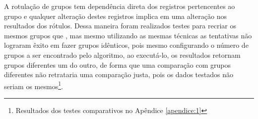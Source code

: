 A rotulação de grupos tem dependência direta dos registros pertencentes ao grupo e qualquer alteração destes registros implica em uma alteração nos resultados dos rótulos. Dessa maneira foram realizados testes para recriar os mesmos grupos que , mas mesmo utilizando as mesmas técnicas as tentativas não lograram êxito em fazer grupos idênticos, pois mesmo configurando o número de grupos a ser encontrado pelo algoritmo, ao executá-lo, os resultados retornam grupos diferentes um do outro, de forma que uma comparação com grupos diferentes não retrataria uma comparação justa, pois os dados testados não seriam os mesmos\footnote{Resultados dos testes comparativos no Apêndice \ref{apendice:1}}.









